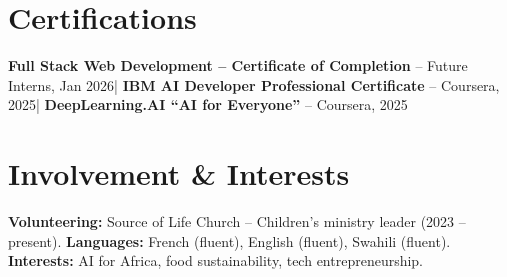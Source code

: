 \documentclass[a4paper,9.5pt]{extarticle}
\begin{document}
\section{Certifications}
{\small
\textbf{Full Stack Web Development -- Certificate of Completion} -- Future Interns, Jan 2026\enspace|\enspace
\textbf{IBM AI Developer Professional Certificate} -- Coursera, 2025\enspace|\enspace
\textbf{DeepLearning.AI ``AI for Everyone''} -- Coursera, 2025
}

\section{Involvement \& Interests}
{\small
\textbf{Volunteering:} Source of Life Church -- Children's ministry leader (2023 -- present).\enspace
\textbf{Languages:} French (fluent), English (fluent), Swahili (fluent).\enspace
\textbf{Interests:} AI for Africa, food sustainability, tech entrepreneurship.
}
\end{document}
